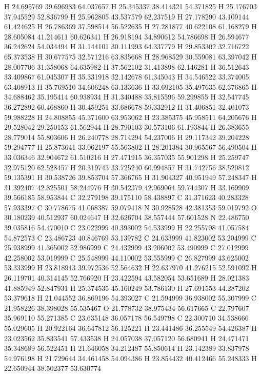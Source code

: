 \documentclass{article}
\begin{document}
H 24.695769 39.696983 64.037657
H 25.345337 38.414321 54.371825
H 25.176703 37.945529 52.836799
H 25.962805 43.537579 62.237519
H 27.178290 43.109144 61.424625
H 26.786369 37.598514 56.522635
H 27.281877 40.622108 61.168279
H 28.605084 41.214611 60.626341
H 26.918194 34.890612 54.786698
H 26.594677 36.242624 54.034494
H 31.144101 30.111993 64.337779
H 29.853302 32.716722 65.373538
H 30.677575 32.571216 63.835668
H 28.968529 30.559081 63.397042
H 28.007706 31.358068 64.635982
H 37.562102 31.413898 62.146281
H 36.512643 33.409867 61.045307
H 35.331918 32.142678 61.345043
H 34.546522 33.374005 63.408913
H 35.769510 34.606248 63.133636
H 33.692105 35.497635 62.376865
H 34.688462 35.195414 60.938934
H 31.340488 35.815596 59.299855
H 32.547745 36.272892 60.468860
H 30.459251 33.686678 59.332912
H 31.406851 32.401073 59.988228
H 24.808855 45.371600 63.953062
H 23.385375 45.958511 64.205676
H 29.528042 29.250153 61.562944
H 28.790103 30.573106 61.193844
H 26.383655 28.779014 55.803606
H 26.240778 28.714294 54.237006
H 29.117342 39.204228 59.294777
H 25.873641 33.062197 55.563802
H 28.201384 30.965567 56.490504
H 33.036346 32.904672 61.510216
H 27.471915 36.357035 55.901298
H 25.259747 32.975120 62.528457
H 20.319743 33.725240 60.994857
H 31.742756 38.520812 59.135391
H 30.538726 39.853704 57.366765
H 31.904327 40.951949 57.248347
H 31.392407 42.825501 58.244976
H 30.542379 42.969064 59.744307
H 33.169909 39.566185 58.953844
C 32.279198 39.175110 58.438897
C 31.371623 40.283328 57.933397
C 30.778675 41.068387 59.079418
N 30.928528 42.381353 59.019792
O 30.180239 40.512937 60.024647
H 32.626704 38.557444 57.601528
N 22.486750 39.035816 54.470010
C 23.022999 40.393002 54.533999
H 22.255798 41.057584 54.872573
C 23.486723 40.846769 53.139782
C 24.633999 41.823002 53.204999
C 25.938999 41.365002 52.986999
C 24.432999 43.206002 53.490999
C 27.012999 42.258002 53.019999
C 25.548999 44.110002 53.555999
C 26.827999 43.625002 53.333999
H 23.818913 39.972536 52.564632
H 22.637970 41.276215 52.591092
H 26.119701 40.314145 52.766920
H 23.422594 43.582054 53.651689
H 28.021383 41.885949 52.847931
H 25.374535 45.160249 53.786130
H 27.691553 44.287202 53.379618
H 21.044552 36.869196 54.393027
C 21.594999 36.938002 55.307999
C 21.958226 38.398028 55.535467
O 21.778732 38.975434 56.617665
C 22.797607 35.969110 55.271385
C 23.635148 36.057178 56.549798
C 22.300710 34.538666 55.029605
H 20.922164 36.647812 56.125221
H 23.441486 36.255549 54.426387
H 23.023562 35.833541 57.433538
H 24.057038 37.057120 56.680941
H 24.471471 35.348689 56.522451
H 21.646058 34.212487 55.850614
H 23.142389 33.837978 54.976198
H 21.729644 34.461458 54.094386
H 23.854432 40.412466 55.248333
H 22.650944 38.502377 53.630774
~    
\end{document}
